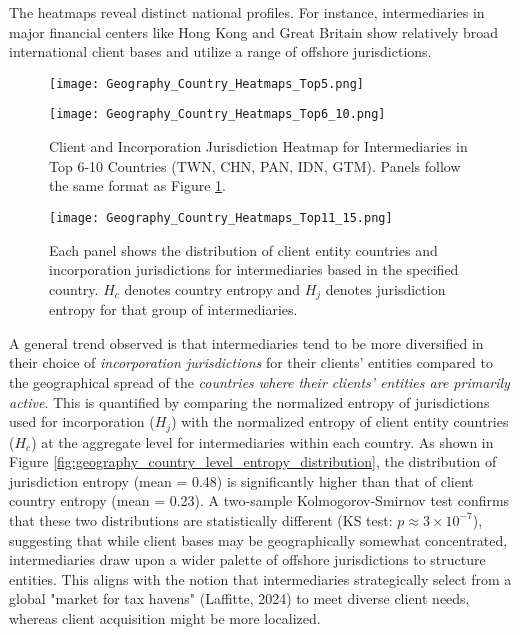 The heatmaps reveal distinct national profiles. For instance, intermediaries in major financial centers like Hong Kong and Great Britain show relatively broad international client bases and utilize a range of offshore jurisdictions.

\begin{figure}[htbp]
    \centering
    \texttt{[image: Geography\_Country\_Heatmaps\_Top5.png]} %
    \caption{}
    \label{fig:geography_country_heatmaps_top5}
\end{figure}
\begin{figure}[htbp]
    \centering
    \texttt{[image: Geography\_Country\_Heatmaps\_Top6\_10.png]} %
    \caption{Client and Incorporation Jurisdiction Heatmap for Intermediaries in Top 6-10 Countries (TWN, CHN, PAN, IDN, GTM). Panels follow the same format as Figure \ref{fig:geography_country_heatmaps_top5}.}
    \label{fig:geography_country_heatmaps_top6_10}
\end{figure}

\begin{figure}[htbp]
    \centering
    \texttt{[image: Geography\_Country\_Heatmaps\_Top11\_15.png]} %
    \caption{Each panel shows the distribution of client entity countries and incorporation jurisdictions for intermediaries based in the specified country. $H_c$ denotes country entropy and $H_j$ denotes jurisdiction entropy for that group of intermediaries.}
    \label{fig:geography_country_heatmaps_top11_15}
\end{figure}

A general trend observed is that intermediaries tend to be more diversified in their choice of \textit{incorporation jurisdictions} for their clients' entities compared to the geographical spread of the \textit{countries where their clients' entities are primarily active}. This is quantified by comparing the normalized entropy of jurisdictions used for incorporation ($H_j$) with the normalized entropy of client entity countries ($H_c$) at the aggregate level for intermediaries within each country. As shown in Figure \ref{fig:geography_country_level_entropy_distribution}, the distribution of jurisdiction entropy (mean = 0.48) is significantly higher than that of client country entropy (mean = 0.23). A two-sample Kolmogorov-Smirnov test confirms that these two distributions are statistically different (KS test: $p \approx 3 \times 10^{-7}$), suggesting that while client bases may be geographically somewhat concentrated, intermediaries draw upon a wider palette of offshore jurisdictions to structure entities. This aligns with the notion that intermediaries strategically select from a global "market for tax havens" (Laffitte, 2024) to meet diverse client needs, whereas client acquisition might be more localized.

